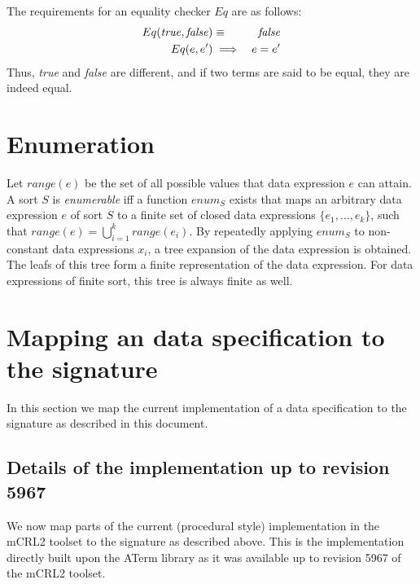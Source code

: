 \documentclass[a4paper,11pt]{article}
\begin{document}
The requirements for an equality checker $Eq$ are as follows:
\begin{eqnarray*}
 Eq({\it true}, {\it false}) & \equiv & {\it false}\\
 Eq(e, e')                   & \implies & e = e'
\end{eqnarray*}
Thus, \textit{true} and \textit{false} are different, and if two terms are said to be equal, they are indeed equal.

\section{Enumeration}
Let $range(e)$ be the set of all possible values that data expression $e$ can attain. A sort $S$ is \emph{enumerable} iff a function $enum_S$ exists that maps an arbitrary data expression $e$ of sort $S$ to a finite set of closed data expressions $\{ e_1, \dots, e_k \}$, such that $range(e) = \bigcup_{i=1}^{k} range(e_i)$. By repeatedly applying $enum_S$ to non-constant data expressions $x_i$, a tree expansion of the data expression is obtained. The leafs of this tree form a finite representation of the data expression. For data expressions of finite sort, this tree is always finite as well.

\section{Mapping an data specification to the signature}
In this section we map the current implementation of a data specification to the signature as described in this document.

\subsection{Details of the implementation up to revision 5967}
We now map parts of the current (procedural style) implementation in the mCRL2 toolset to the signature as described above. This is the implementation directly built upon the ATerm library as it was available up to revision 5967 of the mCRL2 toolset.
\end{document}
